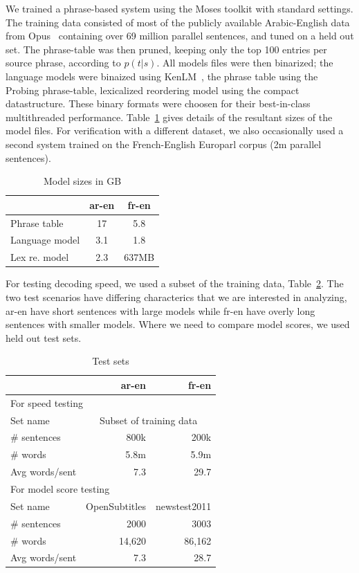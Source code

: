 \documentclass[11pt]{article}
\begin{document}
We trained a phrase-based system using the Moses toolkit with standard settings. The training data consisted of most of the publicly available Arabic-English data from Opus~\cite{tiedemann2012parallel} containing over 69 million parallel sentences, and tuned on a held out set. The phrase-table was then pruned, keeping only the top 100 entries per source phrase, according to $p(t|s)$. All models files were then binarized; the language models were binaized using KenLM~\cite{Heafield-kenlm}, the phrase table using the Probing phrase-table, lexicalized reordering model using the compact datastructure. These binary formats were choosen for their best-in-class multithreaded performance. Table~\ref{tab:model-files} gives details of the resultant sizes of the model files. For verification with a different dataset, we also occasionally used a second system trained on the French-English Europarl corpus (2m parallel sentences). 
\begin{table}[h]
\begin{center}
\begin{tabular}{|l|c|c|} \hline
		& ar-en	& fr-en \\ \hline
Phrase table  	& 17 	& 5.8 \\
Language model 	& 3.1  	& 1.8 \\ 
Lex re. model	& 2.3	& 637MB \\ \hline
\end{tabular}
\end{center}
\caption{Model sizes in GB}
\label{tab:model-files}
\end{table}
For testing decoding speed, we used a subset of the training data, Table~\ref{tab:test-sets}. The two test scenarios have differing characterics that we are interested in analyzing, ar-en have short sentences with large models while fr-en have overly long sentences with smaller models. Where we need to compare model scores, we used held out test sets.

\begin{table}[h]
\begin{center}
\small
\begin{tabular}{|l|r|r|} \hline
		& ar-en		& fr-en \\ \hline
\multicolumn{3}{|l|}{For speed testing} \\ \hline
Set name	& \multicolumn{2}{|c|}{Subset of training data} \\
\# sentences  	& 800k 		& 200k \\
\# words 	& 5.8m 		& 5.9m \\ 
Avg words/sent	& 7.3		& 29.7 \\ \hline
\multicolumn{3}{|l|}{For model score testing} \\ \hline
Set name	& OpenSubtitles	& newstest2011 \\
\# sentences  	& 2000 		& 3003 \\
\# words 	& 14,620 	& 86,162 \\ 
Avg words/sent	& 7.3		& 28.7 \\ \hline
\end{tabular}
\end{center}
\caption{Test sets}
\label{tab:test-sets}
\end{table}
\end{document}
